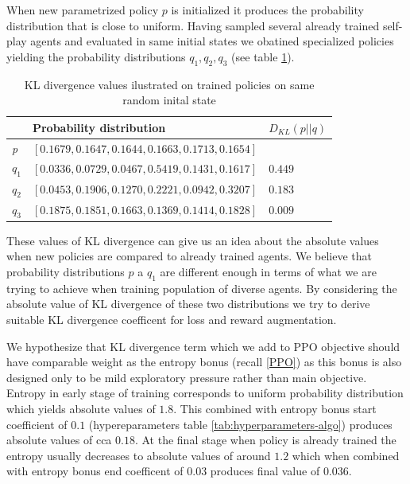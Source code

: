 When new parametrized policy $p$ is initialized it produces the probability distribution that is close to uniform.
Having sampled several already trained self-play agents and evaluated in same initial states we obatined specialized policies yielding the probability distributions $q_1, q_2, q_3$ (see table \ref{tab:KLDiv-distributions}).


\begin{table}[htbp]
    \small
    \centering
    \begin{tabular}{lll}
      \toprule
      \                                & Probability distribution     & $D_{KL}(p||q)$         \\ \midrule
      \textit{p}     &$[0.1679, 0.1647, 0.1644, 0.1663, 0.1713, 0.1654]$                                   &                                   \\ \midrule            
      $q_1$                     & $[0.0336, 0.0729, 0.0467, 0.5419, 0.1431, 0.1617]$                            & $0.449$                            \\
      $q_2$                         & $[0.0453, 0.1906, 0.1270, 0.2221, 0.0942, 0.3207]$                            & $0.183$                            \\
      $q_3$                                & $[0.1875, 0.1851, 0.1663, 0.1369, 0.1414, 0.1828]$                         & $0.009$                               \\
      
     \bottomrule
    \end{tabular}
    \caption{KL divergence values ilustrated on trained policies on same random inital state}
    \label{tab:KLDiv-distributions}
\end{table}

These values of KL divergence can give us an idea about the absolute values when new policies are compared to already trained agents.
We believe that probability distributions $p$ a $q_1$ are different enough in terms of what we are trying to achieve when training population of diverse agents.
By considering the absolute value of KL divergence of these two distributions we try to derive suitable KL divergence coefficent for loss and reward augmentation. 

We hypothesize that KL divergence term which we add to PPO objective should have comparable weight as the entropy bonus (recall \ref{PPO}) as this bonus is also designed only to be mild exploratory pressure rather than main objective.
Entropy in early stage of training corresponds to uniform probability distribution which yields absolute values of $1.8$. 
This combined with entropy bonus start coefficient of $0.1$ (hypereparameters table \ref{tab:hyperparameters-algo}) produces absolute values of cca $0.18$.
At the final stage when policy is already trained the entropy usually decreases to absolute values of around $1.2$ which when combined with entropy bonus end coefficent of $0.03$ produces final value of $0.036$.

